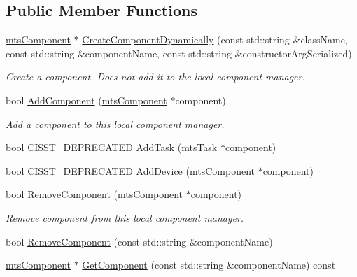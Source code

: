 \subsection*{Public Member Functions}
\begin{DoxyCompactItemize}
\item 
\hyperlink{classmts_component}{mts\+Component} $\ast$ \hyperlink{classmts_manager_local_a4e139dea89d4a31bde99039e06544eef}{Create\+Component\+Dynamically} (const std\+::string \&class\+Name, const std\+::string \&component\+Name, const std\+::string \&constructor\+Arg\+Serialized)
\begin{DoxyCompactList}\small\item\em Create a component. Does not add it to the local component manager. \end{DoxyCompactList}\item 
bool \hyperlink{classmts_manager_local_a6e5cdc58e96867f5c5a64029d09dd0ab}{Add\+Component} (\hyperlink{classmts_component}{mts\+Component} $\ast$component)
\begin{DoxyCompactList}\small\item\em Add a component to this local component manager. \end{DoxyCompactList}\item 
bool \hyperlink{cmn_portability_8h_a63da7164735f9501be651b1f2bbc0121}{C\+I\+S\+S\+T\+\_\+\+D\+E\+P\+R\+E\+C\+A\+T\+E\+D} \hyperlink{classmts_manager_local_ad3af6da6429d0a32136a4d99860be415}{Add\+Task} (\hyperlink{classmts_task}{mts\+Task} $\ast$component)
\item 
bool \hyperlink{cmn_portability_8h_a63da7164735f9501be651b1f2bbc0121}{C\+I\+S\+S\+T\+\_\+\+D\+E\+P\+R\+E\+C\+A\+T\+E\+D} \hyperlink{classmts_manager_local_afc0bff17b131efa51a277085a22f0f5c}{Add\+Device} (\hyperlink{classmts_component}{mts\+Component} $\ast$component)
\item 
bool \hyperlink{classmts_manager_local_a25f28571c9ff7c60a78e5753020d2971}{Remove\+Component} (\hyperlink{classmts_component}{mts\+Component} $\ast$component)
\begin{DoxyCompactList}\small\item\em Remove component from this local component manager. \end{DoxyCompactList}\item 
bool \hyperlink{classmts_manager_local_a137be62a7188c0fc0efb7130efac2ca5}{Remove\+Component} (const std\+::string \&component\+Name)
\item 
\hyperlink{classmts_component}{mts\+Component} $\ast$ \hyperlink{classmts_manager_local_a2ea0b384d25496b455a55b18883b99b8}{Get\+Component} (const std\+::string \&component\+Name) const 

\end{DoxyCompactItemize}
